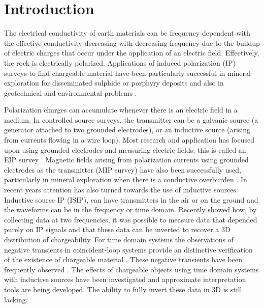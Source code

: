 \documentclass[extra,mreferee]{gji}
\begin{document}

\linenumbers
\section{Introduction}
The electrical conductivity of earth materials can be frequency dependent with the effective conductivity decreasing with decreasing frequency due to the buildup of electric charges that occur under the application of an electric field. Effectively, the rock is electrically polarized.
Applications of induced polarization (IP) surveys to find chargeable material  have been particularly successful in mineral exploration for disseminated sulphide or porphyry deposits \cite[]{Pelton1978, Fink1990} and also in geotechnical and environmental problems \cite[]{Li2000,Kemna2012}.


Polarization charges can accumulate whenever there is an electric field in a medium. In controlled source surveys, the transmitter can be a galvanic source (a generator attached to two grounded electrodes), or an inductive source (arising from currents flowing in a wire loop). Most research and application has focused upon using grounded electrodes and measuring electric fields; this is called an EIP survey \cite[]{seigel1959}. Magnetic fields arising from polarization currents using grounded electrodes as the transmitter (MIP survey) have also been successfully used, particularly in mineral exploration when there is a conductive overburden \cite[]{seigel1974}. In recent years attention has also turned towards the use of inductive sources. Inductive source IP (ISIP), can have transmitters in the air or on the ground and the waveforms can be in  the frequency or time domain. Recently  \cite[]{Marchant2012b} showed how, by collecting data at two frequencies, it was possible to measure data that depended purely on IP signals and that these data can be inverted to recover a 3D distribution of chargeability.
For time domain systems the observations of negative transients in coincident-loop systems provide an distinctive verification of the existence of chargeable material \cite[]{Weidelt1982}. These negative transients have been frequently observed \cite[]{SmithandKlein,Kang2015a}. The effects of chargeable objects using time domain systems with inductive sources have been investigated \cite[]{Smith1988a,Flis1989,ElKaliouby2004, Marchant2014} and approximate interpretation tools \cite[]{Kratzer2012,Hodges2014} are being developed. The ability to fully invert these data in 3D is still lacking.
\end{document}
